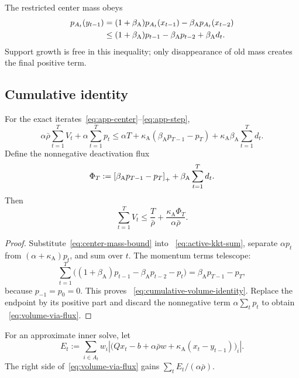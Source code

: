 The restricted center mass obeys
\begin{align}
 p_{A_t}(y_{t-1})
 &=(1+\beta_{\mathrm A})p_{A_t}(x_{t-1})
   -\beta_{\mathrm A} p_{A_t}(x_{t-2}) \notag\\
 &\le (1+\beta_{\mathrm A})p_{t-1}-\beta_{\mathrm A} p_{t-2}+\beta_{\mathrm A} d_t.
 \label{eq:center-mass-bound}
\end{align}
Support growth is free in this inequality; only disappearance of old mass
creates the final positive term.

\subsection{Cumulative identity}

\begin{theorem}
\label{thm:cumulative-volume}
For the exact iterates~\eqref{eq:app-center}--\eqref{eq:app-step},
\begin{equation}
 \alpha\bar\rho\sum_{t=1}^T V_t
 +\alpha\sum_{t=1}^T p_t
 \le
 \alpha T+\kappa_{\mathrm A}(\beta_{\mathrm A} p_{T-1}-p_T)
 +\kappa_{\mathrm A}\beta_{\mathrm A}\sum_{t=1}^T d_t.
 \label{eq:cumulative-volume-identity}
\end{equation}
Define the nonnegative deactivation flux
\begin{equation}
 \Phi_T
 :=\left[\beta_{\mathrm A} p_{T-1}-p_T\right]_{+}
   +\beta_{\mathrm A}\sum_{t=1}^T d_t.
 \label{eq:flux}
\end{equation}
Then
\begin{equation}
 \sum_{t=1}^T V_t
 \le \frac{T}{\bar\rho}
     +\frac{\kappa_{\mathrm A}\Phi_T}{\alpha\bar\rho}.
 \label{eq:volume-via-flux}
\end{equation}
\end{theorem}

\begin{proof}
Substitute~\eqref{eq:center-mass-bound} into
~\eqref{eq:active-kkt-sum}, separate $\alpha p_t$ from
$(\alpha+\kappa_{\mathrm A})p_t$, and sum over $t$.  The momentum terms telescope:
\[
 \sum_{t=1}^T
 \bigl((1+\beta_{\mathrm A})p_{t-1}-\beta_{\mathrm A} p_{t-2}-p_t\bigr)
 =\beta_{\mathrm A} p_{T-1}-p_T,
\]
because $p_{-1}=p_0=0$.  This proves
~\eqref{eq:cumulative-volume-identity}.  Replace the endpoint by its positive
part and discard the nonnegative term $\alpha\sum_t p_t$ to obtain
~\eqref{eq:volume-via-flux}.
\end{proof}

For an approximate inner solve, let
\begin{equation}
 E_t:=\sum_{i\in A_t}w_i
 \left|
   \bigl(Qx_t-b+\alpha\bar\rho w
          +\kappa_{\mathrm A}(x_t-y_{t-1})\bigr)_i
 \right|.
 \label{eq:inner-kkt-error}
\end{equation}
The right side of~\eqref{eq:volume-via-flux} gains
$\sum_tE_t/(\alpha\bar\rho)$.

